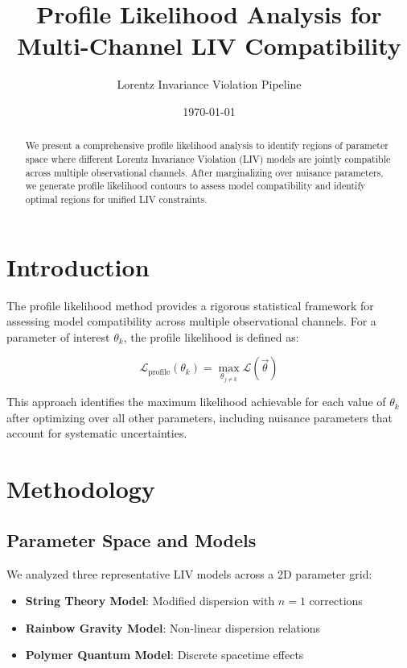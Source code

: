 \documentclass[11pt]{article}
\title{Profile Likelihood Analysis for Multi-Channel LIV Compatibility}
\author{Lorentz Invariance Violation Pipeline}
\date{\today}
\begin{document}
\maketitle

\begin{abstract}
We present a comprehensive profile likelihood analysis to identify regions of parameter space where different Lorentz Invariance Violation (LIV) models are jointly compatible across multiple observational channels. After marginalizing over nuisance parameters, we generate profile likelihood contours to assess model compatibility and identify optimal regions for unified LIV constraints.
\end{abstract}

\section{Introduction}

The profile likelihood method provides a rigorous statistical framework for assessing model compatibility across multiple observational channels. For a parameter of interest $\theta_k$, the profile likelihood is defined as:

\begin{equation}
\mathcal{L}_{\text{profile}}(\theta_k) = \max_{\theta_{j \neq k}} \mathcal{L}(\vec{\theta})
\end{equation}

This approach identifies the maximum likelihood achievable for each value of $\theta_k$ after optimizing over all other parameters, including nuisance parameters that account for systematic uncertainties.

\section{Methodology}

\subsection{Parameter Space and Models}

We analyzed three representative LIV models across a 2D parameter grid:
\begin{itemize}
    \item \textbf{String Theory Model}: Modified dispersion with $n=1$ corrections
    \item \textbf{Rainbow Gravity Model}: Non-linear dispersion relations
    \item \textbf{Polymer Quantum Model}: Discrete spacetime effects
\end{itemize}
\end{document}
